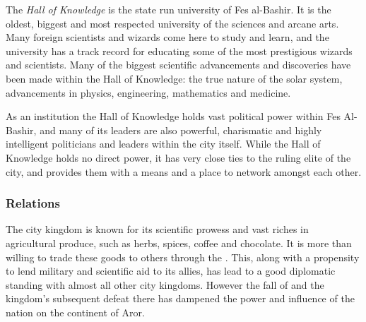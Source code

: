 The \emph{Hall of Knowledge} is the state run university of Fes al-Bashir. It
is the oldest, biggest and most respected university of the sciences and
arcane arts. Many foreign scientists and wizards come here to study and
learn, and the university has a track record for educating some of the most
prestigious wizards and scientists. Many of the biggest scientific
advancements and discoveries have been made within the Hall of Knowledge: the
true nature of the solar system, advancements in physics, engineering,
mathematics and medicine.

As an institution the Hall of Knowledge holds vast political power within
Fes Al-Bashir, and many of its leaders are also powerful, charismatic and highly
intelligent politicians and leaders within the city itself. While the Hall of
Knowledge holds no direct power, it has very close ties to the ruling elite of
the city, and provides them with a means and a place to network amongst each
other.

\subsubsection{Relations}

The city kingdom is known for its scientific prowess and vast riches in
agricultural produce, such as herbs, spices, coffee and chocolate. It is more
than willing to trade these goods to others through the . This, along with a propensity to lend military and
scientific aid to its allies, has lead to a good diplomatic standing with
almost all other city kingdoms. However the fall of  and
the kingdom's subsequent defeat there has dampened the power and influence of
the nation on the continent of Aror.
